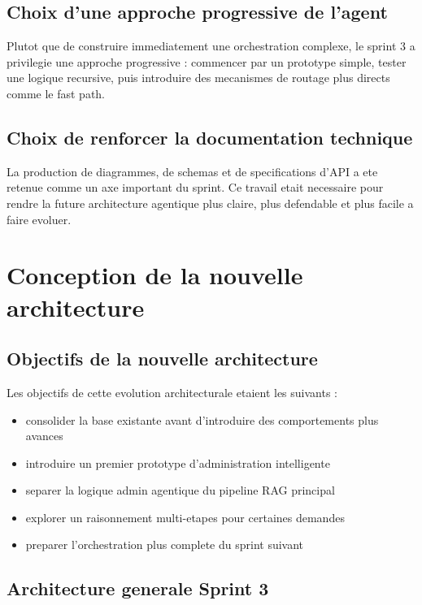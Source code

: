 \subsection{Choix d'une approche progressive de l'agent}

Plutot que de construire immediatement une orchestration complexe, le sprint 3 a privilegie une approche progressive : commencer par un prototype simple, tester une logique recursive, puis introduire des mecanismes de routage plus directs comme le fast path.

\subsection{Choix de renforcer la documentation technique}

La production de diagrammes, de schemas et de specifications d'API a ete retenue comme un axe important du sprint. Ce travail etait necessaire pour rendre la future architecture agentique plus claire, plus defendable et plus facile a faire evoluer.

\section{Conception de la nouvelle architecture}

\subsection{Objectifs de la nouvelle architecture}

Les objectifs de cette evolution architecturale etaient les suivants :

\begin{itemize}
\item consolider la base existante avant d'introduire des comportements plus avances
\item introduire un premier prototype d'administration intelligente
\item separer la logique admin agentique du pipeline RAG principal
\item explorer un raisonnement multi-etapes pour certaines demandes
\item preparer l'orchestration plus complete du sprint suivant
\end{itemize}

\subsection{Architecture generale Sprint 3}

